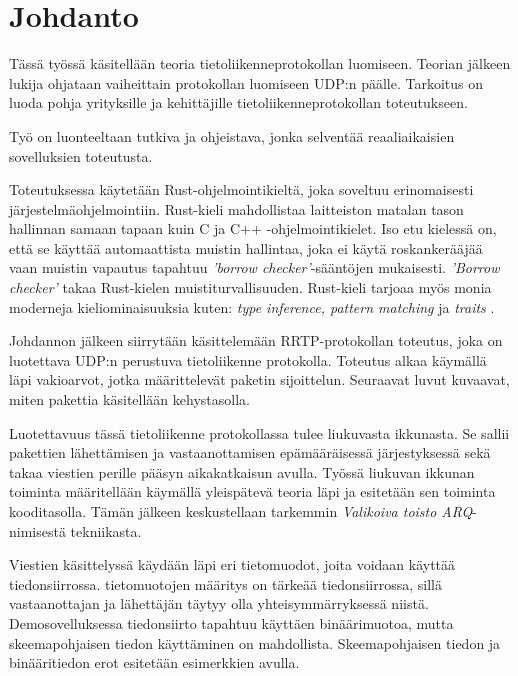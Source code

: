 \documentclass[a4paper,12pt]{article}
\begin{document}
\pagestyle{plain}

    \section{Johdanto}\label{sec:johdanto}
    Tässä työssä käsitellään teoria tietoliikenneprotokollan luomiseen. Teorian jälkeen lukija ohjataan vaiheittain protokollan luomiseen UDP:n päälle. Tarkoitus on luoda pohja yrityksille ja kehittäjille tietoliikenneprotokollan toteutukseen.
    \par Työ on luonteeltaan tutkiva ja ohjeistava, jonka selventää reaaliaikaisien sovelluksien toteutusta.\par

Toteutuksessa käytetään Rust-ohjelmointikieltä, joka soveltuu erinomaisesti järjestelmäohjelmointiin. Rust-kieli mahdollistaa laitteiston matalan tason hallinnan
    samaan tapaan kuin C ja C++ -ohjelmointikielet. Iso etu kielessä on, että se käyttää automaattista muistin hallintaa, joka ei käytä roskankerääjää vaan muistin vapautus tapahtuu \textit{'borrow checker'}-sääntöjen mukaisesti.
    \textit{'Borrow checker'} takaa Rust-kielen muistiturvallisuuden. 
    Rust-kieli tarjoaa myös monia moderneja kieliominaisuuksia kuten: \textit{type
    inference, pattern matching} ja \textit{traits} \cite{rust-book}.

    Johdannon jälkeen siirrytään käsittelemään RRTP-protokollan toteutus, joka on luotettava UDP:n perustuva tietoliikenne protokolla.
    Toteutus alkaa käymällä läpi vakioarvot, jotka määrittelevät paketin sijoittelun. Seuraavat luvut kuvaavat, miten pakettia käsitellään kehystasolla. \par

    Luotettavuus tässä tietoliikenne protokollassa tulee liukuvasta ikkunasta. Se sallii pakettien lähettämisen ja vastaanottamisen epämääräisessä järjestyksessä sekä takaa viestien perille pääsyn aikakatkaisun avulla. Työssä liukuvan ikkunan toiminta määritellään käymällä yleispätevä teoria läpi ja esitetään sen toiminta kooditasolla. Tämän jälkeen keskustellaan tarkemmin \textit{Valikoiva toisto ARQ}-nimisestä tekniikasta.

    Viestien käsittelyssä käydään läpi eri tietomuodot, joita voidaan käyttää tiedonsiirrossa. tietomuotojen määritys on tärkeää tiedonsiirrossa, sillä vastaanottajan ja lähettäjän täytyy olla yhteisymmärryksessä niistä. Demosovelluksessa tiedonsiirto tapahtuu käyttäen binäärimuotoa, mutta skeemapohjaisen tiedon käyttäminen on mahdollista. Skeemapohjaisen tiedon ja binääritiedon erot esitetään esimerkkien avulla.\par
\end{document}
